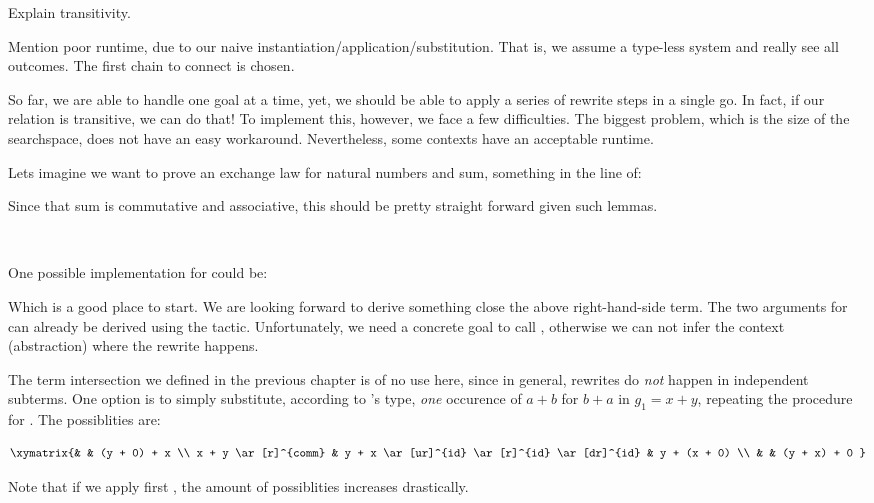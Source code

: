 \begin{TODO}
  \item Explain transitivity.
  \item Mention poor runtime, due to our naive instantiation/application/substitution.
        That is, we assume a type-less system and really see all outcomes.
        The first chain to connect is chosen.
\end{TODO}

So far, we are able to handle one goal at a time, yet, we should be able to
apply a series of rewrite steps in a single go. In fact, if our relation
is transitive, we can do that! To implement this, however, we face a few
difficulties. The biggest problem, which is the size of the searchspace,
does not have an easy workaround. Nevertheless, some contexts have an acceptable runtime.
 
Lets imagine we want to prove an exchange law for natural numbers and sum, something
in the line of:


Since that sum is commutative and associative, this should be pretty straight forward
given such lemmas.

\\

One possible implementation for  could be:


Which is a good place to start. We are looking forward to derive something close the above
right-hand-side term. The two arguments for  can already be derived using the 
tactic. Unfortunately, we need a concrete goal to call , otherwise we can not infer the
context (abstraction) where the rewrite happens.

The term intersection we defined in the previous chapter is of no use here, since in general,
rewrites do \emph{not} happen in independent subterms. One option is to simply substitute, according
to 's type, \emph{one} occurence of $a + b$ for $b + a$ in $g_1 = x + y$, repeating
the procedure for . The possiblities are:

\begin{displaymath}
\xymatrix{%
  & & (y + 0) + x \\
x + y \ar[r]^{comm} & y + x \ar[ur]^{id} \ar[r]^{id} \ar[dr]^{id} & y + (x + 0) \\
& & (y + x) + 0
}
\end{displaymath}

Note that if we apply first , the amount of possiblities increases drastically.

